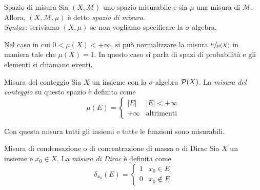 \documentclass[a4paper]{article}
\begin{document}
\begin{radioactive}
\begin{snippetdefinition}{Spazio di misura}
    Sia \((X, \mathcal M)\) uno spazio misurabile e sia \(\mu\)
    una misura di \(\mathcal M\).
    Allora, \((X, \mathcal M, \mu)\) è detto \emph{spazio di misura}. \\
    \emph{Syntax:} scriviamo \((X, \mu)\) se non vogliamo specificare la \(\sigma\)-algebra.
\end{snippetdefinition}
\end{radioactive}

\begin{radioactive}
Nel caso in cui \(0<\mu(X)<+\infty\), si può normalizzare la misura
\(\sfrac{\mu}{\mu(X)}\) in maniera tale che \(\mu(X) = 1\).
In questo caso si parla di spazi di probabilità e gli elementi si chiamano eventi.
\end{radioactive}

\begin{radioactive}
\begin{snippetdefinition}{Misura del conteggio}
    Sia \(X\) un insieme con la \(\sigma\)-algebra \(\mathcal P(X)\).
    La \emph{misura del conteggio} su questo spazio è definita come
    \[
        \mu(E) =
        \begin{cases}
            |E| & |E| < +\infty \\
            +\infty & \text{altrimenti}
        \end{cases}
    \]
\end{snippetdefinition}
\end{radioactive}

\begin{radioactive}
Con questa misura tutti gli insiemi e tutte le funzioni sono misurabili.
\end{radioactive}

\begin{radioactive}
\begin{snippetdefinition}{Misura di condensazione o di concentrazione di massa o di Dirac}
    Sia \(X\) un insieme e \(x_0 \in X\). La \emph{misura di Dirac} è definita come
    \[
        \delta_{x_0}(E) =
        \begin{cases}
            1 & x_0 \in E \\
            0 & x_0 \notin E
        \end{cases}
    \]
\end{snippetdefinition}
\end{radioactive}
\end{document}
